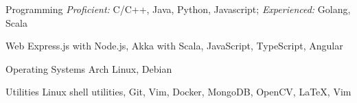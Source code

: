 \begin{cvskills}

  \cvskill
  {Programming}
  {\textit{Proficient: } C/C++, Java, Python, Javascript; \hspace{0.3cm}
    \textit{Experienced: } Golang, Scala}

  \cvskill
  {Web}
  {Express.js with Node.js, Akka with Scala, JavaScript, TypeScript, Angular}

  \cvskill
  {Operating Systems}
  {Arch Linux, Debian}

  \cvskill
  {Utilities}
  {Linux shell utilities, Git, Vim, Docker,
    MongoDB, OpenCV, \LaTeX, Vim}

\end{cvskills}

